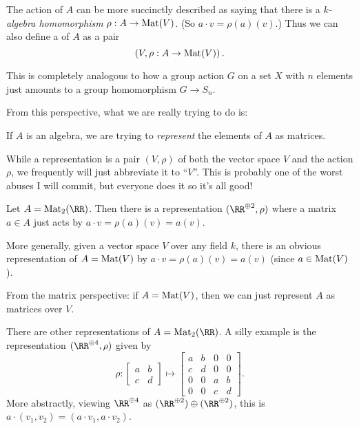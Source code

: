 \begin{definition}
	The action of $A$ can be more succinctly described as saying
	that there is a \emph{$k$-algebra homomorphism} $\rho : A \to \mathrm{Mat}(V)$.
	(So $a \cdot v = \rho(a)(v)$.)
	Thus we can also define a  of $A$ as a pair
	\[ \left( V, \rho : A \to \mathrm{Mat}(V) \right). \]
\end{definition}
\begin{remark}
	This is completely analogous to how a group action $G$ on a set $X$
	with $n$ elements just amounts to a group homomorphism $G \to S_n$.
\end{remark}
From this perspective, what we are really trying to do is:
\begin{moral}
	If $A$ is an algebra,
	we are trying to \emph{represent}
	the elements of $A$ as matrices.
\end{moral}

\begin{abuse}
	While a representation is a pair $(V, \rho)$
	of both the vector space $V$ and the action $\rho$,
	we frequently will just abbreviate it to ``$V$''.
	This is probably one of the worst abuses I will commit,
	but everyone does it so it's all good!
\end{abuse}


\begin{example}
	\listhack
	\begin{enumerate}[(a)]
		\ii Let $A = \Mat_2(\RR)$.
		Then there is a representation $(\RR^{\oplus 2}, \rho)$
		where a matrix $a \in A$ just acts by $a \cdot v = \rho(a)(v) = a(v)$.

		\ii More generally, given a vector space $V$ over any field $k$,
		there is an obvious representation of $A = \mathrm{Mat}(V)$
		by $a \cdot v = \rho(a)(v) = a(v)$ (since $a \in \mathrm{Mat}(V)$).

		From the matrix perspective: if $A = \mathrm{Mat}(V)$,
		then we can just represent $A$ as matrices over $V$.

		\ii There are other representations of $A = \Mat_2(\RR)$.
		A silly example is the representation $(\RR^{\oplus 4}, \rho)$ given by
		\[
			\rho : 
			\begin{bmatrix} a & b \\ c & d \end{bmatrix} 
			\mapsto
			\begin{bmatrix} a & b & 0 & 0 \\ c & d & 0 & 0 \\
				0 & 0 & a & b \\ 0 & 0 & c & d \end{bmatrix} .
		\]
		More abstractly, viewing $\RR^{\oplus 4}$ as
		$(\RR^{\oplus 2}) \oplus (\RR^{\oplus 2})$,
		this is $a \cdot (v_1,v_2) = (a \cdot v_1, a \cdot v_2)$.
	\end{enumerate}
\end{example}

